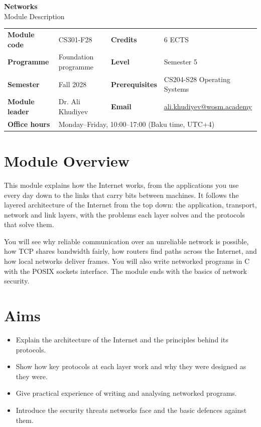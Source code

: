 \documentclass[11pt,a4paper]{article}
\makeatletter
\newcommand{\ModuleTitle}{Networks}
\newcommand{\ModuleCode}{CS301-F28}
\newcommand{\Programme}{Foundation programme}
\newcommand{\Level}{Semester 5}
\newcommand{\Semester}{Fall 2028}
\newcommand{\Credits}{6 ECTS}
\newcommand{\ModuleLeader}{Dr. Ali Khudiyev}
\newcommand{\Email}{ali.khudiyev@wosm.academy}
\newcommand{\OfficeHours}{Monday--Friday, 10:00--17:00 (Baku time, UTC+4)}
\newcommand{\Prerequisites}{CS204-S28 Operating Systems}
\makeatother
\begin{document}
\begin{center}
  {\LARGE\bfseries\color{accent} \ModuleTitle}\\[4pt]
  {\large Module Description}
\end{center}
\vspace{6pt}

\begin{tabularx}{\textwidth}{>{\bfseries}l X >{\bfseries}l X}
\toprule
Module code   & \ModuleCode    & Credits      & \Credits \\
Programme     & \Programme     & Level        & \Level \\
Semester      & \Semester      & Prerequisites & \Prerequisites \\
Module leader & \ModuleLeader  & Email        & \href{mailto:\Email}{\Email} \\
Office hours  & \multicolumn{3}{l}{\OfficeHours} \\
\bottomrule
\end{tabularx}

\section{Module Overview}
This module explains how the Internet works, from the applications you use every day
down to the links that carry bits between machines. It follows the layered
architecture of the Internet from the top down: the application, transport, network
and link layers, with the problems each layer solves and the protocols that solve
them.

You will see why reliable communication over an unreliable network is possible, how
TCP shares bandwidth fairly, how routers find paths across the Internet, and how
local networks deliver frames. You will also write networked programs in C with the
POSIX sockets interface.
The module ends with the basics of network security.

\section{Aims}
\begin{itemize}
  \item Explain the architecture of the Internet and the principles behind its protocols.
  \item Show how key protocols at each layer work and why they were designed as they were.
  \item Give practical experience of writing and analysing networked programs.
  \item Introduce the security threats networks face and the basic defences against them.
\end{itemize}
\end{document}
